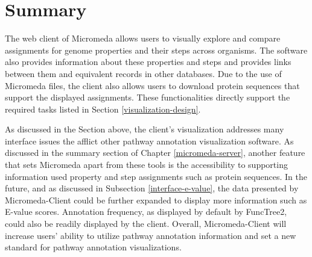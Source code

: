 \section{Summary} \label{micromeda-client-summary}

The web client of Micromeda allows users to visually explore and compare 
assignments for genome properties and their steps across organisms. The software 
also provides information about these properties and steps and provides links 
between them and equivalent records in other databases. Due to the use of 
Micromeda files, the client also allows users to download protein sequences that 
support the displayed assignments. These functionalities directly support the 
required tasks listed in Section \ref{visualization-design}.

As discussed in the Section above, the client's visualization addresses many 
interface issues the afflict other pathway annotation visualization software. As 
discussed in the summary section of Chapter \ref{micromeda-server}, another 
feature that sets Micromeda apart from these tools is the accessibility to 
supporting information used property and step assignments such as protein 
sequences. In the future, and as discussed in Subsection 
\ref{interface-e-value}, the data presented by Micromeda-Client could be further 
expanded to display more information such as E-value scores. Annotation 
frequency, as displayed by default by FuncTree2, could also be readily displayed 
by the client. Overall, Micromeda-Client will increase users' ability to utilize 
pathway annotation information and set a new standard for pathway annotation 
visualizations.
